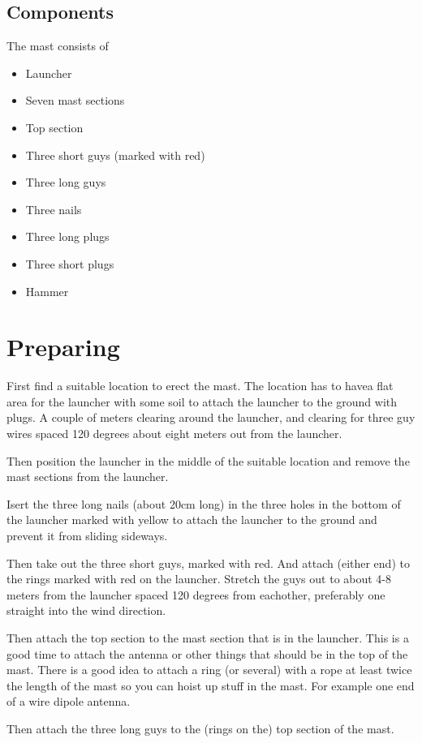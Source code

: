 \documentclass{article}
\begin{document}
\subsection{Components}
The mast consists of
\begin{itemize}
\item Launcher
\item Seven mast sections
\item Top section
\item Three short guys (marked with red)
\item Three long guys
\item Three nails
\item Three long plugs
\item Three short plugs
\item Hammer
\end{itemize}

\section{Preparing}
First find a suitable location to erect the mast. The location has to havea flat area for the launcher with some soil to attach the launcher to the ground with plugs. A couple of meters clearing around the launcher, and clearing for three guy wires spaced 120 degrees about eight meters out from the launcher.

Then position the launcher in the middle of the suitable location and remove the mast sections from the launcher.

Isert the three long nails (about 20cm long) in the three holes in the bottom of the launcher marked with yellow to attach the launcher to the ground and prevent it from sliding sideways.

Then take out the three short guys, marked with red. And attach (either end) to the rings marked with red on the launcher. Stretch the guys out to about 4-8 meters from the launcher spaced 120 degrees from eachother, preferably one straight into the wind direction.

Then attach the top section to the mast section that is in the launcher.
This is a good time to attach the antenna or other things that should be in the top of the mast. There is a good idea to attach a ring (or several)  with a rope at least twice the length of the mast so you can hoist up stuff in the mast. For example one end of a wire dipole antenna.

Then attach the three long guys to the (rings on the) top section of the mast.
\end{document}
